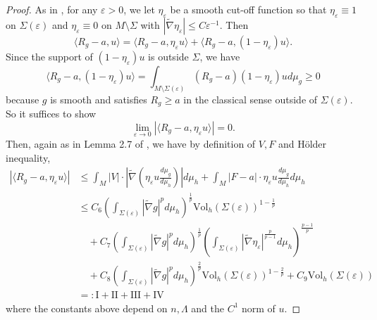 \documentclass[12pt]{amsart}
\theoremstyle{plain}
\theoremstyle{plain}
\theoremstyle{definition}
\theoremstyle{remark}
\numberwithin{equation}{subsection}
\newcommand{\hdel}{\tilde{\nabla}}
\begin{document}
\begin{proof}
    As in \cite{jiang_removable_2022}, for any $\varepsilon > 0$, we let $\eta_\varepsilon$ be a smooth cut-off function so that $\eta_\varepsilon \equiv 1$ on $\Sigma(\varepsilon)$ and $\eta_\varepsilon \equiv 0$ on $M\setminus\Sigma$ with $|\hdel \eta_\varepsilon|\leq C\varepsilon^{-1}$. Then
    \begin{equation*}
        \langle R_{g} - a, u\rangle = \langle R_g - a, \eta_\varepsilon u\rangle + \langle R_g - a, (1-\eta_\varepsilon)u\rangle.
    \end{equation*}
    Since the support of $(1-\eta_\varepsilon)u$ is outside $\Sigma$, we have
    \begin{equation*}
        \langle R_g - a, (1-\eta_\varepsilon)u\rangle = \int_{M\setminus \Sigma(\varepsilon)} (R_g - a)(1-\eta_\varepsilon)u d\mu_g \geq 0
    \end{equation*}
    because $g$ is smooth and satisfies $R_g \geq a$ in the classical sense outside of $\Sigma(\varepsilon)$. So it suffices to show
    \begin{equation*}
        \lim\limits_{\varepsilon \to 0}\left|\langle R_g - a,\eta_\varepsilon u\rangle\right| = 0.
    \end{equation*}
    Then, again as in Lemma 2.7 of \cite{jiang_removable_2022}, we have by definition of $V, F$ and H\"older inequality,
    \begin{align}\label{eqn:distributional-scalar-curvature-integral-estimate}
        \left|\langle R_g - a,\eta_\varepsilon u\rangle\right| & \leq \int_M |V| \cdot \left| \hdel \left(\eta_\varepsilon u \frac{d\mu_g}{d\mu_h}\right)\right| d\mu_h + \int_M |F - a|\cdot \eta_\varepsilon u \frac{d\mu_g}{d\mu_h}d\mu_h \nonumber \\
        &\leq C_6\left(\int_{\Sigma(\varepsilon)}|\hdel g|^pd\mu_h\right)^\frac{1}{p}\text{Vol}_h(\Sigma(\varepsilon))^{1-\frac{1}{p}} \nonumber \\
        &\quad + C_7\left(\int_{\Sigma(\varepsilon)}|\hdel g|^pd\mu_h\right)^\frac{1}{p}\left(\int_{\Sigma(\varepsilon)}|\hdel\eta_\varepsilon|^\frac{p}{p-1}d\mu_h\right)^\frac{p-1}{p} \nonumber \\
        &\quad + C_8\left(\int_{\Sigma(\varepsilon)}|\hdel g|^pd\mu_h\right)^\frac{2}{p}\text{Vol}_h(\Sigma(\varepsilon))^{1-\frac{2}{p}} + C_9\text{Vol}_h(\Sigma(\varepsilon)) \nonumber \\
        &=: \text{I} + \text{II} + \text{III} + \text{IV}
    \end{align}
    where the constants above depend on $n,\Lambda$ and the $C^1$ norm of $u$.
    

\end{proof}
\end{document}
